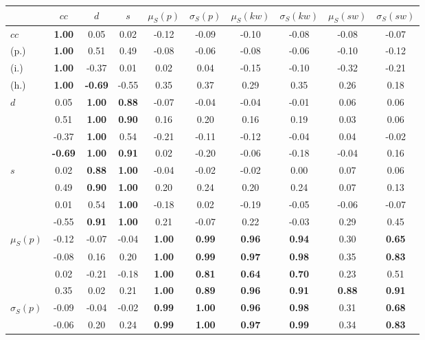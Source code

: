 \begin{table*}[h!]
\begin{center}
\begin{tabular}{| l || c | c | c | c | c | c | c | c | c |}\hline
 & $cc$ & $d$ & $s$ & $\mu_S(p)$ & $\sigma_S(p)$ & $\mu_S(kw)$ & $\sigma_S(kw)$ & $\mu_S(sw)$ & $\sigma_S(sw)$ \\\hline\hline
$cc$ & {\bf 1.00} & 0.05 & 0.02 & -0.12 & -0.09 & -0.10 & -0.08 & -0.08 & -0.07 \\
(p.) & {\bf 1.00} & 0.51 & 0.49 & -0.08 & -0.06 & -0.08 & -0.06 & -0.10 & -0.12 \\
(i.) & {\bf 1.00} & -0.37 & 0.01 & 0.02 & 0.04 & -0.15 & -0.10 & -0.32 & -0.21 \\
(h.) & {\bf 1.00} & {\bf -0.69} & -0.55 & 0.35 & 0.37 & 0.29 & 0.35 & 0.26 & 0.18 \\\hline
$d$ & 0.05 & {\bf 1.00} & {\bf 0.88} & -0.07 & -0.04 & -0.04 & -0.01 & 0.06 & 0.06 \\
 & 0.51 & {\bf 1.00} & {\bf 0.90} & 0.16 & 0.20 & 0.16 & 0.19 & 0.03 & 0.06 \\
 & -0.37 & {\bf 1.00} & 0.54 & -0.21 & -0.11 & -0.12 & -0.04 & 0.04 & -0.02 \\
 & {\bf -0.69} & {\bf 1.00} & {\bf 0.91} & 0.02 & -0.20 & -0.06 & -0.18 & -0.04 & 0.16 \\\hline
$s$ & 0.02 & {\bf 0.88} & {\bf 1.00} & -0.04 & -0.02 & -0.02 & 0.00 & 0.07 & 0.06 \\
 & 0.49 & {\bf 0.90} & {\bf 1.00} & 0.20 & 0.24 & 0.20 & 0.24 & 0.07 & 0.13 \\
 & 0.01 & 0.54 & {\bf 1.00} & -0.18 & 0.02 & -0.19 & -0.05 & -0.06 & -0.07 \\
 & -0.55 & {\bf 0.91} & {\bf 1.00} & 0.21 & -0.07 & 0.22 & -0.03 & 0.29 & 0.45 \\\hline
$\mu_S(p)$ & -0.12 & -0.07 & -0.04 & {\bf 1.00} & {\bf 0.99} & {\bf 0.96} & {\bf 0.94} & 0.30 & {\bf 0.65} \\
 & -0.08 & 0.16 & 0.20 & {\bf 1.00} & {\bf 0.99} & {\bf 0.97} & {\bf 0.98} & 0.35 & {\bf 0.83} \\
 & 0.02 & -0.21 & -0.18 & {\bf 1.00} & {\bf 0.81} & {\bf 0.64} & {\bf 0.70} & 0.23 & 0.51 \\
 & 0.35 & 0.02 & 0.21 & {\bf 1.00} & {\bf 0.89} & {\bf 0.96} & {\bf 0.91} & {\bf 0.88} & {\bf 0.91} \\\hline
$\sigma_S(p)$ & -0.09 & -0.04 & -0.02 & {\bf 0.99} & {\bf 1.00} & {\bf 0.96} & {\bf 0.98} & 0.31 & {\bf 0.68} \\
 & -0.06 & 0.20 & 0.24 & {\bf 0.99} & {\bf 1.00} & {\bf 0.97} & {\bf 0.99} & 0.34 & {\bf 0.83} \\

\end{tabular}
\end{center}
\end{table*}
